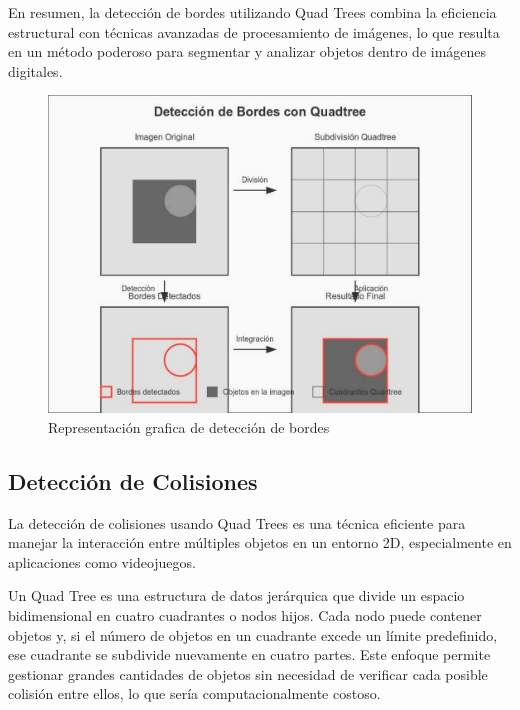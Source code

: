 \documentclass[9pt,a4paper,twoside]{rho-class/rho}
\begin{document}
        En resumen, la detección de bordes utilizando Quad Trees combina la eficiencia estructural con técnicas avanzadas de procesamiento de imágenes, lo que resulta en un método poderoso para segmentar y analizar objetos dentro de imágenes digitales.
        \begin{figure}[h]
            \centering
            \includegraphics[width=\linewidth]{figures/edge-detection.pdf}
            \caption{Representación grafica de detección de bordes} 
            \label{fig:deteccion_figure}
        \end{figure}
    \subsection[Detección de Colisiones]{Detección de Colisiones}

        La detección de colisiones usando Quad Trees es una técnica eficiente para manejar la interacción entre múltiples objetos en un entorno 2D, especialmente en aplicaciones como videojuegos.

        Un Quad Tree es una estructura de datos jerárquica que divide un espacio bidimensional en cuatro cuadrantes o nodos hijos. Cada nodo puede contener objetos y, si el número de objetos en un cuadrante excede un límite predefinido, ese cuadrante se subdivide nuevamente en cuatro partes. Este enfoque permite gestionar grandes cantidades de objetos sin necesidad de verificar cada posible colisión entre ellos, lo que sería computacionalmente costoso.
\end{document}
